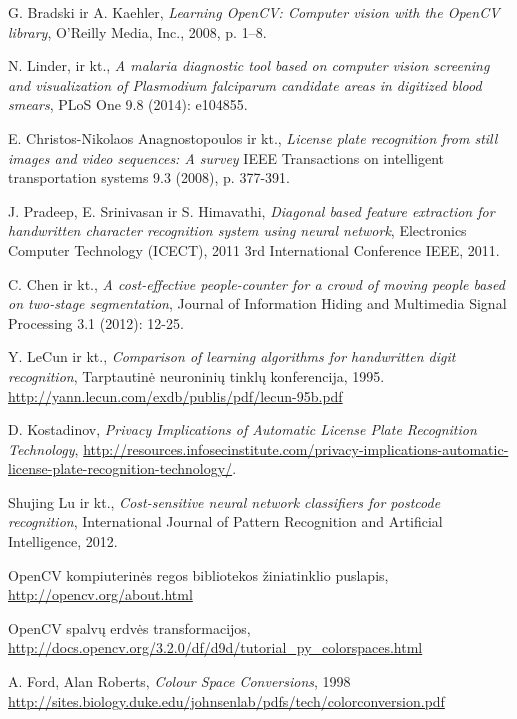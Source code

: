\documentclass[a4paper,12pt]{article}
\begin{document}
 
\clearpage 
\begin{thebibliography}{99}
G. Bradski ir A. Kaehler, \textit{Learning OpenCV: Computer vision with the OpenCV library}, O'Reilly Media, Inc., 2008, p. 1–8.

N. Linder, ir kt., \textit{A malaria diagnostic tool based on computer vision screening and visualization of Plasmodium falciparum candidate areas in digitized blood smears}, PLoS One 9.8 (2014): e104855.

E. Christos-Nikolaos Anagnostopoulos ir kt., \textit{License plate recognition from still images and video sequences: A survey} IEEE Transactions on intelligent transportation systems 9.3 (2008), p. 377-391.

J. Pradeep, E. Srinivasan ir S. Himavathi, \textit{Diagonal based feature extraction for handwritten character recognition system using neural network}, Electronics Computer Technology (ICECT), 2011 3rd International Conference IEEE, 2011.

C. Chen ir kt., \textit{A cost-effective people-counter for a crowd of moving people based on two-stage segmentation}, Journal of Information Hiding and Multimedia Signal Processing 3.1 (2012): 12-25.
 
Y. LeCun ir kt., \textit{Comparison of learning algorithms for handwritten digit recognition}, Tarptautinė neuroninių tinklų konferencija, 1995.
\url{http://yann.lecun.com/exdb/publis/pdf/lecun-95b.pdf}

D. Kostadinov, \textit{Privacy Implications of Automatic License Plate Recognition Technology}, \url{http://resources.infosecinstitute.com/privacy-implications-automatic-license-plate-recognition-technology/}.

 Shujing Lu ir kt., \textit{Cost-sensitive neural network classifiers for postcode recognition}, International Journal of Pattern Recognition and Artificial Intelligence, 2012.
 
OpenCV kompiuterinės regos bibliotekos žiniatinklio puslapis, \url{http://opencv.org/about.html}

OpenCV spalvų erdvės transformacijos, \url{http://docs.opencv.org/3.2.0/df/d9d/tutorial_py_colorspaces.html}

A. Ford, Alan Roberts, \textit{Colour Space Conversions}, 1998
\url{http://sites.biology.duke.edu/johnsenlab/pdfs/tech/colorconversion.pdf}


\end{thebibliography}
\end{document}
